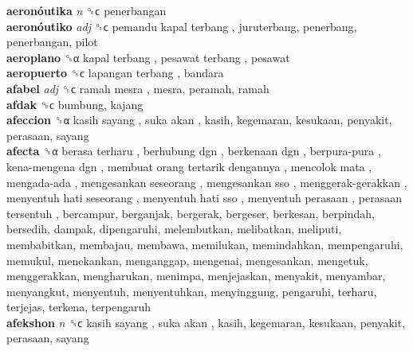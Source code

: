 \textbf{aeronóutika} \emph{n}  ␝ϲ  penerbangan  \\
\textbf{aeronóutiko} \emph{adj}  ␝ϲ   pemandu kapal terbang , juruterbang, penerbang, penerbangan, pilot  \\
\textbf{aeroplano} ␝α   kapal terbang ,  pesawat terbang , pesawat  \\
\textbf{aeropuerto} ␝ϲ   lapangan terbang , bandara  \\
\textbf{afabel} \emph{adj}  ␝ϲ   ramah mesra , mesra, peramah, ramah  \\
\textbf{afdak} ␝ϲ  bumbung, kajang  \\
\textbf{afeccion} ␝α   kasih sayang ,  suka akan , kasih, kegemaran, kesukaan, penyakit, perasaan, sayang  \\
\textbf{afecta} ␝α   berasa terharu ,  berhubung dgn ,  berkenaan dgn ,  berpura-pura ,  kena-mengena dgn ,  membuat orang tertarik dengannya ,  mencolok mata ,  mengada-ada ,  mengesankan seseorang ,  mengesankan sso ,  menggerak-gerakkan ,  menyentuh hati seseorang ,  menyentuh hati sso ,  menyentuh perasaan ,  perasaan tersentuh , bercampur, berganjak, bergerak, bergeser, berkesan, berpindah, bersedih, dampak, dipengaruhi, melembutkan, melibatkan, meliputi, membabitkan, membajau, membawa, memilukan, memindahkan, mempengaruhi, memukul, menekankan, menganggap, mengenai, mengesankan, mengetuk, menggerakkan, mengharukan, menimpa, menjejaskan, menyakit, menyambar, menyangkut, menyentuh, menyentuhkan, menyinggung, pengaruhi, terharu, terjejas, terkena, terpengaruh  \\
\textbf{afekshon} \emph{n}  ␝ϲ   kasih sayang ,  suka akan , kasih, kegemaran, kesukaan, penyakit, perasaan, sayang  \\
